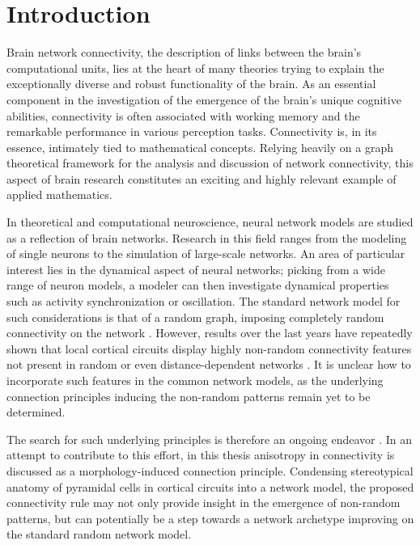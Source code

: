\chapter{Introduction}\label{ch:Introduction} 

Brain network connectivity, the description of links between the
brain's computational units, lies at the heart of many theories trying
to explain the exceptionally diverse and robust functionality of the
brain. As an essential component in the investigation of the emergence
of the brain's unique cognitive abilities, connectivity is often
associated with working memory and the remarkable performance in
various perception tasks. Connectivity is, in its essence, intimately
tied to mathematical concepts. Relying heavily on a graph theoretical
framework for the analysis and discussion of network connectivity,
this aspect of brain research constitutes an exciting and highly
relevant example of applied mathematics.

In theoretical and computational neuroscience, neural network models
are studied as a reflection of brain networks. Research in this field
ranges from the modeling of single neurons to the simulation of
large-scale networks. An area of particular interest lies in the
dynamical aspect of neural networks; picking from a wide range of
neuron models, a modeler can then investigate dynamical properties
such as activity synchronization or oscillation. The standard network
model for such considerations is that of a random graph, imposing
completely random connectivity on the
network \parencite{Brunel2000}. However, results over the last years
have repeatedly shown that local cortical circuits display highly
non-random connectivity features not present in random or even
distance-dependent networks \parencite{Song2005, Perin2011}. It is
unclear how to incorporate such features in the common network models,
as the underlying connection principles inducing the non-random
patterns remain yet to be determined.


The search for such underlying principles is therefore an ongoing
endeavor \parencite[cf.][]{Klinshov2014}. In an attempt to contribute
to this effort, in this thesis anisotropy in connectivity is discussed
as a morpho\-logy-induced connection principle. Condensing
stereotypical anatomy of pyramidal cells in cortical circuits into a
network model, the proposed connectivity rule may not only provide
insight in the emergence of non-random patterns, but can potentially
be a step towards a network archetype improving on the standard random
network model.

